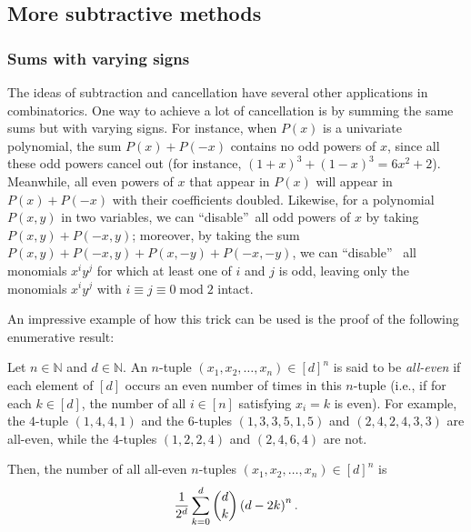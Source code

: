 \subsection{\label{sec.cancel.moresub}More subtractive methods}

\subsubsection{\label{subsec.cancel.moresub.all-even}Sums with varying signs}

The ideas of subtraction and cancellation have several other applications in
combinatorics. One way to achieve a lot of cancellation is by summing the same
sums but with varying signs. For instance, when $P\left(  x\right)  $ is a
univariate polynomial, the sum $P\left(  x\right)  +P\left(  -x\right)  $
contains no odd powers of $x$, since all these odd powers cancel out (for
instance, $\left(  1+x\right)  ^{3}+\left(  1-x\right)  ^{3}=6x^{2}+2$).
Meanwhile, all even powers of $x$ that appear in $P\left(  x\right)  $ will
appear in $P\left(  x\right)  +P\left(  -x\right)  $ with their coefficients
doubled. Likewise, for a polynomial $P\left(  x,y\right)  $ in two variables,
we can \textquotedblleft disable\textquotedblright\ all odd powers of $x$ by
taking $P\left(  x,y\right)  +P\left(  -x,y\right)  $; moreover, by taking the
sum $P\left(  x,y\right)  +P\left(  -x,y\right)  +P\left(  x,-y\right)
+P\left(  -x,-y\right)  $, we can \textquotedblleft disable\textquotedblright%
\ all monomials $x^{i}y^{j}$ for which at least one of $i$ and $j$ is odd,
leaving only the monomials $x^{i}y^{j}$ with $i\equiv j\equiv
0\operatorname{mod}2$ intact.

An impressive example of how this trick can be used is the proof of the
following enumerative result:

\begin{theorem}
\label{thm.cancel.all-even}Let $n\in\mathbb{N}$ and $d\in\mathbb{N}$. An
$n$-tuple $\left(  x_{1},x_{2},\ldots,x_{n}\right)  \in\left[  d\right]  ^{n}$
is said to be \emph{all-even} if each element of $\left[  d\right]  $ occurs
an even number of times in this $n$-tuple (i.e., if for each $k\in\left[
d\right]  $, the number of all $i\in\left[  n\right]  $ satisfying $x_{i}=k$
is even). For example, the $4$-tuple $\left(  1,4,4,1\right)  $ and the
$6$-tuples $\left(  1,3,3,5,1,5\right)  $ and $\left(  2,4,2,4,3,3\right)  $
are all-even, while the $4$-tuples $\left(  1,2,2,4\right)  $ and $\left(
2,4,6,4\right)  $ are not.

Then, the number of all all-even $n$-tuples $\left(  x_{1},x_{2},\ldots
,x_{n}\right)  \in\left[  d\right]  ^{n}$ is
\[
\dfrac{1}{2^{d}}\sum_{k=0}^{d}\dbinom{d}{k}\left(  d-2k\right)  ^{n}.
\]

\end{theorem}

